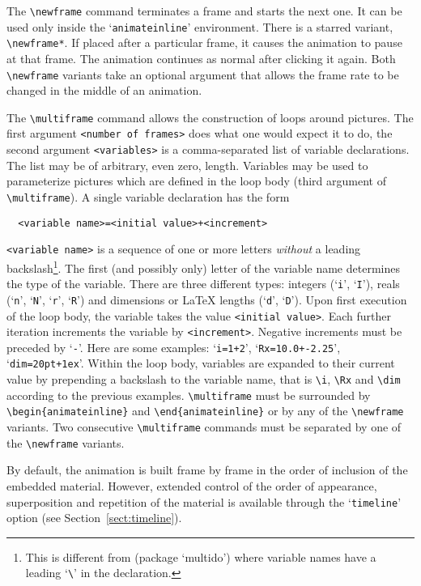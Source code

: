 \documentclass[a4paper]{article}
\begin{document}
The \verb+\newframe+ command terminates a frame and starts the next one. It can be used only inside the `\verb+animateinline+' environment. There is a starred variant, \verb+\newframe*+. If placed after a particular frame, it causes the animation to pause at that frame. The animation continues as normal after clicking it again. Both \verb+\newframe+ variants take an optional argument that allows the frame rate to be changed in the middle of an animation.

The \verb+\multiframe+ command allows the construction of loops around pictures. The first argument \verb+<number of frames>+ does what one would expect it to do, the second argument \verb+<variables>+ is a comma-separated list of variable declarations. The list may be of arbitrary, even zero, length. Variables may be used to parameterize pictures which are defined in the loop body (third argument of \verb+\multiframe+). A single variable declaration has the form
\begin{verbatim}
  <variable name>=<initial value>+<increment>
\end{verbatim}
\verb+<variable name>+ is a sequence of one or more letters \emph{without} a leading backslash\footnote{This is different from {\tt\string\multido} (package `multido') where variable names have a leading `{\tt\textbackslash}' in the declaration.}. The first (and possibly only) letter of the variable name determines the type of the variable. There are three different types: integers (`\verb+i+', `\verb+I+'), reals (`\verb+n+', `\verb+N+', `\verb+r+', `\verb+R+') and dimensions or \LaTeX{} lengths (`\verb+d+', `\verb+D+'). Upon first execution of the loop body, the variable takes the value \verb+<initial value>+. Each further iteration increments the variable by \verb+<increment>+. Negative increments must be preceded by `\verb+-+'. Here are some examples: `\verb:i=1+2:', `\verb:Rx=10.0+-2.25:', `\verb:dim=20pt+1ex:'. Within the loop body, variables are expanded to their current value by prepending a backslash to the variable name, that is \verb+\i+, \verb+\Rx+ and \verb+\dim+ according to the previous examples. \verb+\multiframe+ must be surrounded by \verb+\begin{animateinline}+ and \verb+\end{animateinline}+ or by any of the \verb+\newframe+ variants. Two consecutive \verb+\multiframe+ commands must be separated by one of the \verb+\newframe+ variants.

By default, the animation is built frame by frame in the order of inclusion of the embedded material. However, extended control of the order of appearance, superposition and repetition of the material is available through the `\verb+timeline+' option (see Section~\ref{sect:timeline}).
\end{document}
